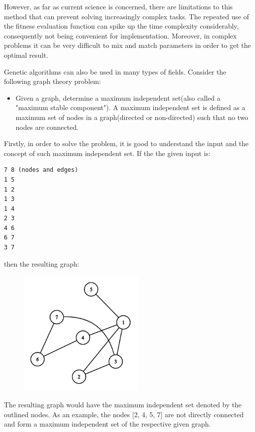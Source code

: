 \documentclass[letterpaper]{article}
\begin{document}
However, as far as current science is concerned, there are limitations to this method that can prevent solving increasingly complex tasks. The repeated use of the fitness evaluation function can spike up the time complexity considerably, consequently not being convenient for implementation. Moreover, in complex problems it can be very difficult to mix and match parameters in order to get the optimal result.

Genetic algorithms can also be used in many types of fields. Consider the following graph theory problem:

\begin{itemize}
    \item Given a graph, determine a maximum independent set(also called a "maximum stable component"). A maximum independent set is defined as a maximum set of nodes in a graph(directed or non-directed) such that no two nodes are connected.
\end{itemize}

Firstly, in order to solve the problem, it is good to understand the input and the concept of such maximum independent set. If the the given input is:

\begin{lstlisting}
7 8 (nodes and edges)
1 5
1 2
1 3
1 4
2 3
4 6
6 7
3 7
\end{lstlisting}

then the resulting graph:

\begin{figure} [h!]
\centering
\includegraphics[width=0.55\textwidth]{pngOfDiagrams/graphgenetic.png}
\end{figure}

The resulting graph would have the maximum independent set denoted by the outlined nodes. As an example, the nodes [2, 4, 5, 7] are not directly connected and form a maximum independent set of the respective given graph.
\end{document}
